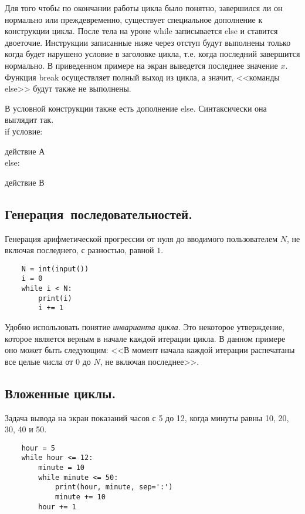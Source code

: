 \documentclass[a4paper, fleqn]{article}
\begin{document}
	Для того чтобы по окончании работы цикла было понятно, завершился ли он нормально или преждевременно, существует специальное дополнение к конструкции цикла. После тела на уроне while записывается else и ставится двоеточие. Инструкции записанные ниже через отступ будут выполнены только когда будет нарушено условие в заголовке цикла, т.е. когда последний завершится нормально. В приведенном примере на экран выведется последнее значение $x$. Функция break осуществляет полный выход из цикла, а значит, <<команды else>> будут также не выполнены.
	
	
	В условной конструкции также есть дополнение else. Синтаксически она выглядит так.
	\\
	if условие:\par
	\qquad действие А\\
	else: \par
	\qquad действие В\\
	
	\subsection*{Генерация~последовательностей.}

	Генерация арифметической прогрессии от нуля до вводимого пользователем $N$, не включая последнего, с разностью, равной $1$. 
	\begin{lstlisting}
	N = int(input())
	i = 0
	while i < N:
		print(i)
		i += 1
	\end{lstlisting}
	
	Удобно использовать понятие \emph{инварианта цикла}. Это некоторое утверждение, которое является верным в начале каждой итерации цикла. В данном примере оно может быть следующим: <<В момент начала каждой итерации распечатаны все целые числа от $0$ до $N$, не включая последнее>>. 
	
	\subsection*{Вложенные циклы.}
	
	Задача вывода на экран показаний часов с 5 до 12, когда минуты равны 10, 20, 30, 40 и 50.
	\begin{lstlisting}
	hour = 5
	while hour <= 12:
		minute = 10
		while minute <= 50:
			print(hour, minute, sep=':')
			minute += 10
		hour += 1
	\end{lstlisting}
	
\end{document}
